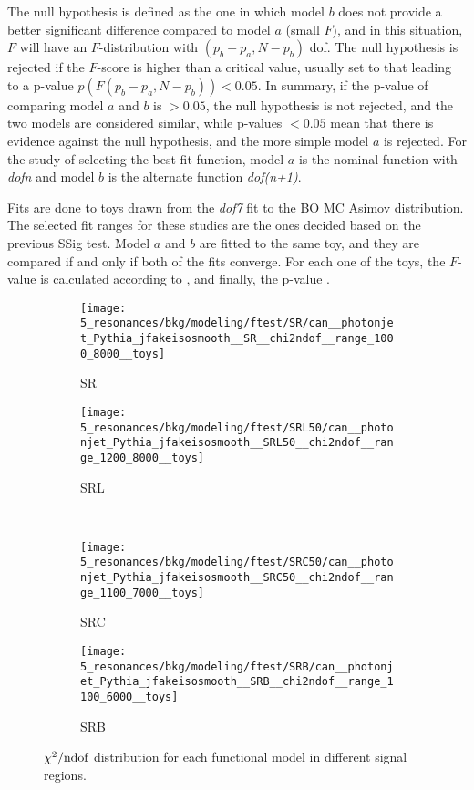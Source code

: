 The null hypothesis is defined as the one in which model \(b\) does not provide a better significant difference compared to model \(a\) (small \(F\)), and in this situation, \(F\) will have an \(F\)-distribution with \((p_b - p_a, N - p_b)\) \ac{dof}. The null hypothesis is rejected if the \(F\)-score is higher than a critical value, usually set to that leading to a p-value \(p\left(F(p_b-p_a, N-p_b)\right)<0.05\). In summary, if the p-value of comparing model \(a\) and \(b\) is \(>0.05\), the null hypothesis is not rejected, and the two models are considered similar, while p-values \(<0.05\) mean that there is evidence against the null hypothesis, and the more simple model \(a\) is rejected.
For the study of selecting the best fit function, model \(a\) is the nominal function with \textit{dofn} and model \(b\) is the alternate function \textit{dof(n+1)}.

Fits are done to toys drawn from the \textit{dof7} fit to the \ac{BO} \ac{MC} Asimov distribution. The selected fit ranges for these studies are the ones decided based on the previous \ac{SSig} test. Model \(a\) and \(b\) are fitted to the same toy, and they are compared if and only if both of the fits converge. For each one of the toys, the \(F\)-value is calculated according to \Eqn{\ref{eq:bkg:modeling:preparation:ftest:ftest}}, and finally, the p-value \pzero.


\begin{figure}[ht!]
    \centering
    \begin{subfigure}[h]{0.49\linewidth}
        \centering
        \texttt{[image: 5\_resonances/bkg/modeling/ftest/SR/can\_\_photonjet\_Pythia\_jfakeisosmooth\_\_SR\_\_chi2ndof\_\_range\_1000\_8000\_\_toys]}
        \caption{SR}
    \end{subfigure}
    \begin{subfigure}[h]{0.49\linewidth}
        \centering
        \texttt{[image: 5\_resonances/bkg/modeling/ftest/SRL50/can\_\_photonjet\_Pythia\_jfakeisosmooth\_\_SRL50\_\_chi2ndof\_\_range\_1200\_8000\_\_toys]}
        \caption{SRL}
    \end{subfigure}
    \\
    \begin{subfigure}[h]{0.49\linewidth}
        \centering
        \texttt{[image: 5\_resonances/bkg/modeling/ftest/SRC50/can\_\_photonjet\_Pythia\_jfakeisosmooth\_\_SRC50\_\_chi2ndof\_\_range\_1100\_7000\_\_toys]}
        \caption{SRC}
    \end{subfigure}
    \begin{subfigure}[h]{0.49\linewidth}
        \centering
        \texttt{[image: 5\_resonances/bkg/modeling/ftest/SRB/can\_\_photonjet\_Pythia\_jfakeisosmooth\_\_SRB\_\_chi2ndof\_\_range\_1100\_6000\_\_toys]}
        \caption{SRB}
    \end{subfigure}
    \caption{\(\chi^{2} / \text{ndof}\) distribution for each functional model in different signal regions.}
    \label{fig:bkg:modeling:preparation:ftest:chi2ndof}
\end{figure}

